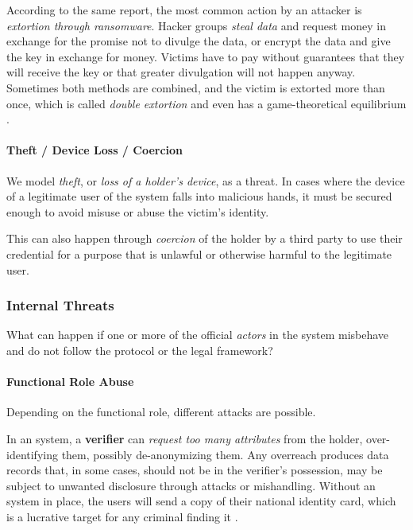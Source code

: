 According to the same report, the most common action by an attacker is \emph{extortion through ransomware}.
Hacker groups \emph{steal data} and request money in exchange for the promise not to divulge the data,
or encrypt the data and give the key in exchange for money.
Victims have to pay without guarantees that they will receive the key or that greater divulgation will not happen anyway.
Sometimes both methods are combined, and the victim is extorted more than once, which is called \emph{double extortion}
and even has a game-theoretical equilibrium \cite{Meurs24}.

\paragraph{Theft / Device Loss / Coercion}

We model \emph{theft}, or \emph{loss of a holder's device}, as a threat.
In cases where the device of a legitimate user of the system falls into malicious hands, it must be secured enough to avoid misuse or abuse the victim's identity.

This can also happen through \emph{coercion} of the holder by a third party to use their
credential for a purpose that is unlawful or otherwise harmful to the legitimate user.

\subsubsection{Internal Threats}
\label{p:internal-threats}

What can happen if one or more of the official \emph{actors} in the \eid system
misbehave and do not follow the protocol or the legal framework?

\paragraph{Functional Role Abuse}

Depending on the functional role, different attacks are possible. 

In an \eid system, a \textbf{verifier} can \emph{request too many attributes} 
from the holder, over-identifying them, possibly de-anonymizing them. 
Any overreach produces data records that, in some cases, should not be in the verifier’s possession, may be subject to unwanted disclosure through attacks or mishandling.
Without an \eid system in place, the users will send a copy of their national identity card, which is a lucrative target for any criminal finding it \cite{Tea25}.

